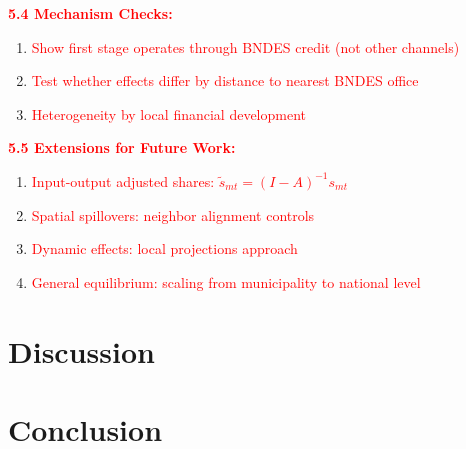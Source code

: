\documentclass{article}
\begin{document}
\textcolor{red}{\textbf{5.4 Mechanism Checks:}}
\begin{enumerate}
    \item \textcolor{red}{Show first stage operates through BNDES credit (not other channels)}
    \item \textcolor{red}{Test whether effects differ by distance to nearest BNDES office}
    \item \textcolor{red}{Heterogeneity by local financial development}
\end{enumerate}

\textcolor{red}{\textbf{5.5 Extensions for Future Work:}}
\begin{enumerate}
    \item \textcolor{red}{Input-output adjusted shares: $\tilde{s}_{mt} = (I-A)^{-1} s_{mt}$}
    \item \textcolor{red}{Spatial spillovers: neighbor alignment controls}
    \item \textcolor{red}{Dynamic effects: local projections approach}
    \item \textcolor{red}{General equilibrium: scaling from municipality to national level}
\end{enumerate}



\section{Discussion}\label{sec:discussion}

\section{Conclusion}\label{sec:conclusion}








\end{document}
